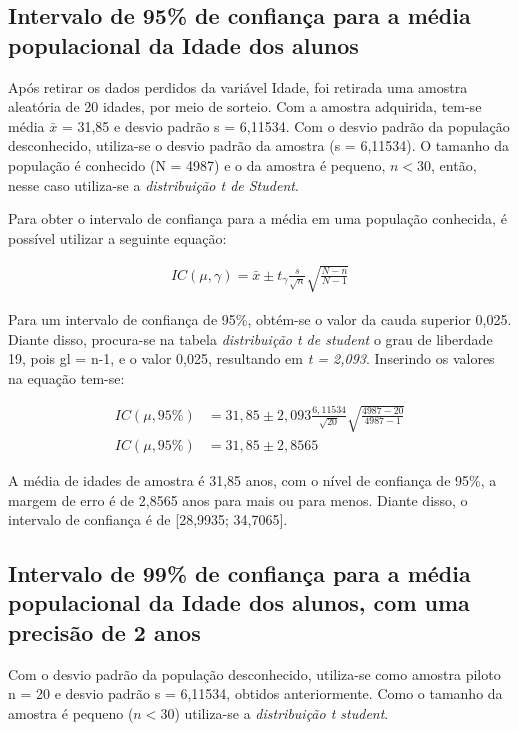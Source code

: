 \subsection{Intervalo de 95\% de confiança para a média populacional da Idade dos alunos}
\label{sub:1a}
	
	Após retirar os dados perdidos da variável Idade, foi retirada uma
	amostra aleatória de 20 idades, por meio de sorteio. Com a amostra
	adquirida, tem-se média $\bar{x}$ = 31,85 e desvio padrão s = 6,11534.
	Com o desvio padrão da população desconhecido, utiliza-se o desvio
	padrão da amostra (s = 6,11534).  O tamanho da população é conhecido (N
	= 4987) e o da amostra é pequeno, $n < 30$, então, nesse caso utiliza-se
	a \textit{distribuição t de Student}.

	Para obter o intervalo de confiança para a média em uma população
	conhecida, é possível utilizar a seguinte equação:

	
	\begin{align}
		\label{eq:dois-a-expr}
		IC (\mu, \gamma) = \bar{x} \pm t_\gamma \frac{s}{\sqrt{n}} \sqrt{\frac{N-n}{N-1}}
	\end{align}

	Para um intervalo de confiança de 95\%, obtém-se o valor da cauda
	superior 0,025. Diante disso, procura-se na tabela \textit{distribuição
	t de student} o grau de liberdade 19, pois gl = n-1, e o valor 0,025,
	resultando em \textit{t = 2,093}. Inserindo os valores na equação
	tem-se:

	\begin{align*}
		IC (\mu, 95\%) &= 31,85 \pm 2,093 \frac{6,11534}{\sqrt{20}} \sqrt{\frac{4987 - 20}{4987 - 1}} \\
		IC (\mu, 95\%) &= 31,85 \pm 2,8565
	\end{align*}

	A média de idades de amostra é 31,85 anos, com o nível de confiança de
	95\%, a margem de erro é de 2,8565 anos para mais ou para menos. Diante
	disso, o intervalo de confiança é de [28,9935; 34,7065].

\subsection{Intervalo de 99\% de confiança para a média populacional da Idade dos alunos, com uma precisão de 2 anos}

	Com o desvio padrão da população desconhecido, utiliza-se como amostra
	piloto n = 20 e desvio padrão s = 6,11534, obtidos anteriormente. Como o
	tamanho da amostra é pequeno ($n < 30$) utiliza-se a
	\textit{distribuição t student}.

